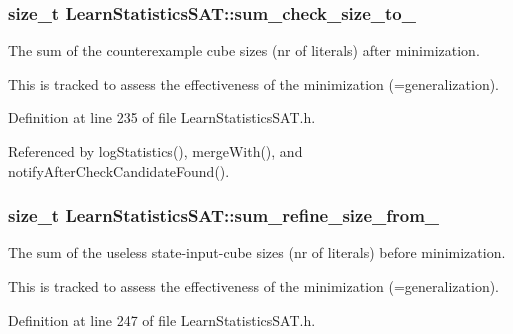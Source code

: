 \hypertarget{classLearnStatisticsSAT_ae805d5a2fc2f724d325136a9f30e6b4b}{
\subsubsection[{sum\-\_\-check\-\_\-size\-\_\-to\-\_\-}]{\setlength{\rightskip}{0pt plus 5cm}size\-\_\-t Learn\-Statistics\-S\-A\-T\-::sum\-\_\-check\-\_\-size\-\_\-to\-\_\-\hspace{0.3cm}{\ttfamily [protected]}}}\label{classLearnStatisticsSAT_ae805d5a2fc2f724d325136a9f30e6b4b}


The sum of the counterexample cube sizes (nr of literals) after minimization. 

This is tracked to assess the effectiveness of the minimization (=generalization). 

Definition at line 235 of file Learn\-Statistics\-S\-A\-T.\-h.



Referenced by log\-Statistics(), merge\-With(), and notify\-After\-Check\-Candidate\-Found().

\hypertarget{classLearnStatisticsSAT_a7f36ead437ee4833c96342d812551cce}{
\subsubsection[{sum\-\_\-refine\-\_\-size\-\_\-from\-\_\-}]{\setlength{\rightskip}{0pt plus 5cm}size\-\_\-t Learn\-Statistics\-S\-A\-T\-::sum\-\_\-refine\-\_\-size\-\_\-from\-\_\-\hspace{0.3cm}{\ttfamily [protected]}}}\label{classLearnStatisticsSAT_a7f36ead437ee4833c96342d812551cce}


The sum of the useless state-\/input-\/cube sizes (nr of literals) before minimization. 

This is tracked to assess the effectiveness of the minimization (=generalization). 

Definition at line 247 of file Learn\-Statistics\-S\-A\-T.\-h.



